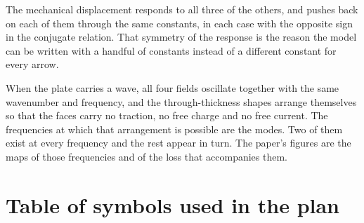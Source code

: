 \documentclass[11pt]{article}
\begin{document}
The mechanical displacement responds to all three of the others, and pushes back on each of them through the
same constants, in each case with the opposite sign in the conjugate relation. That symmetry of the response
is the reason the model can be written with a handful of constants instead of a different constant for every
arrow.

When the plate carries a wave, all four fields oscillate together with the same wavenumber and frequency, and
the through-thickness shapes arrange themselves so that the faces carry no traction, no free charge and no
free current. The frequencies at which that arrangement is possible are the modes. Two of them exist at every
frequency and the rest appear in turn. The paper's figures are the maps of those frequencies and of the loss
that accompanies them.

\section{Table of symbols used in the plan}
\end{document}
